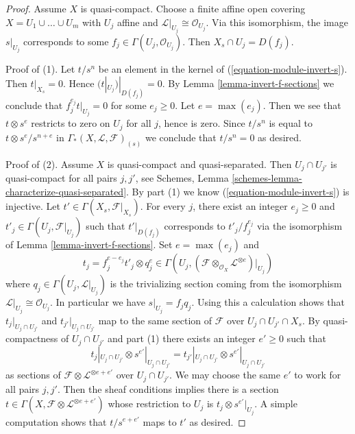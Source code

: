 \begin{proof}
Assume $X$ is quasi-compact. Choose a finite affine open covering
$X = U_1 \cup \ldots \cup U_m$ with $U_j$ affine and
$\mathcal{L}|_{U_j} \cong \mathcal{O}_{U_j}$. Via this isomorphism,
the image $s|_{U_j}$ corresponds to some
$f_j \in \Gamma(U_j, \mathcal{O}_{U_j})$. Then
$X_s \cap U_j = D(f_j)$.

\medskip\noindent
Proof of (1). Let $t/s^n$ be an element in the kernel of
(\ref{equation-module-invert-s}). Then $t|_{X_s} = 0$.
Hence $(t|_{U_j})|_{D(f_j)} = 0$. By
Lemma \ref{lemma-invert-f-sections} we conclude that
$f_j^{e_j} t|_{U_j} = 0$ for some
$e_j \geq 0$. Let $e = \max(e_j)$. Then we see that $t \otimes s^e$
restricts to zero on $U_j$ for all $j$, hence is zero. Since $t/s^n$
is equal to $t \otimes s^e/s^{n + e}$ in
$\Gamma_*(X, \mathcal{L}, \mathcal{F})_{(s)}$ we conclude that $t/s^n = 0$
as desired.

\medskip\noindent
Proof of (2). Assume $X$ is quasi-compact and quasi-separated.
Then $U_j \cap U_{j'}$ is quasi-compact for all pairs $j, j'$, see
Schemes, Lemma \ref{schemes-lemma-characterize-quasi-separated}.
By part (1) we know (\ref{equation-module-invert-s}) is injective.
Let $t' \in \Gamma(X_s, \mathcal{F}|_{X_s})$. For every $j$, there exist an
integer $e_j \geq 0$ and $t'_j \in \Gamma(U_j, \mathcal{F}|_{U_j})$ such that
$t'|_{D(f_j)}$ corresponds to $t'_j/f_j^{e_j}$
via the isomorphism of Lemma \ref{lemma-invert-f-sections}.
Set $e = \max(e_j)$ and
$$
t_j = f_j^{e - e_j} t'_j \otimes q_j^e \in
\Gamma(U_j,
(\mathcal{F} \otimes_{\mathcal{O}_X} \mathcal{L}^{\otimes e})|_{U_j})
$$
where $q_j \in \Gamma(U_j, \mathcal{L}|_{U_j})$ is the trivializing
section coming from the isomorphism
$\mathcal{L}|_{U_j} \cong \mathcal{O}_{U_j}$. In particular we have
$s|_{U_j} = f_j q_j$. Using this a calculation shows that
$t_j|_{U_j \cap U_{j'}}$ and $t_{j'}|_{U_j \cap U_{j'}}$
map to the same section of $\mathcal{F}$ over $U_j \cap U_{j'} \cap X_s$.
By quasi-compactness of $U_j \cap U_{j'}$ and part (1) there exists an
integer $e' \geq 0$ such that
$$
t_j|_{U_j \cap U_{j'}} \otimes s^{e'}|_{U_j \cap U_{j'}} =
t_{j'}|_{U_j \cap U_{j'}} \otimes s^{e'}|_{U_j \cap U_{j'}}
$$
as sections of $\mathcal{F} \otimes \mathcal{L}^{\otimes e + e'}$ over
$U_j \cap U_{j'}$. We may choose the same $e'$ to work for all pairs
$j, j'$. Then the sheaf conditions implies there is a section
$t \in \Gamma(X, \mathcal{F} \otimes \mathcal{L}^{\otimes e + e'})$
whose restriction to $U_j$ is $t_j \otimes s^{e'}|_{U_j}$.
A simple computation shows that $t/s^{e + e'}$ maps to $t'$
as desired.
\end{proof}

